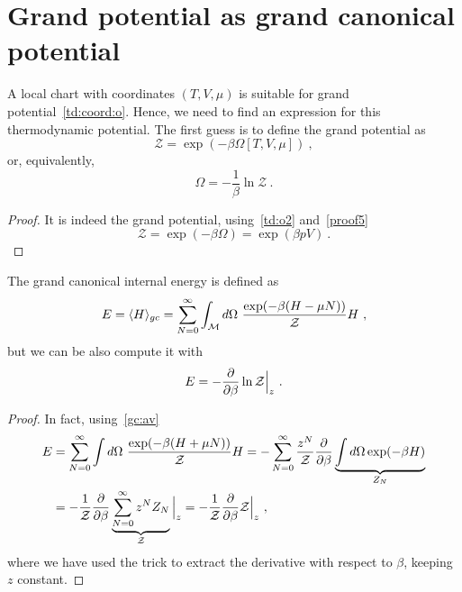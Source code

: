 \section{Grand potential as grand canonical potential} 

    A local chart with coordinates $(T, V, \mu)$ is suitable for grand potential~\eqref{td:coord:o}. Hence, we need to find an expression for this thermodynamic potential. The first guess is to define the grand potential as 
    \begin{equation}\label{gc:zo}
        \mathcal Z = \exp(- \beta \Omega[T, V, \mu]) ~,
    \end{equation}
    or, equivalently,
    \begin{equation}\label{gc:o}
        \Omega = - \frac{1}{\beta} \ln \mathcal Z ~.
    \end{equation}
    \begin{proof}
        It is indeed the grand potential, using~\eqref{td:o2} and~\eqref{proof5}
        \begin{equation*}
            \mathcal Z = \exp(- \beta \Omega) = \exp(\beta p V) ~.
        \end{equation*}
    \end{proof}

    The grand canonical internal energy is defined as
    \begin{equation}\label{gc:e}
        E = \langle H\rangle_{gc} = \sum_{N = 0}^{\infty} \int_{\mathcal M} d\Omega ~ \frac{\exp (-\beta (H - \mu N ))}{\mathcal Z} H ~,
    \end{equation}
    but we can be also compute it with
    \begin{equation}\label{gc:e2}
        E = - \frac{\partial}{\partial\beta} \ln \mathcal Z \Big \vert_z ~.
    \end{equation}
    \begin{proof}
        In fact, using~\eqref{gc:av}
        \begin{equation*}
        \begin{aligned}
            E & = \sum_{N=0}^{\infty} \int d\Omega ~ \frac{\exp(-\beta (H + \mu N))}{\mathcal Z} H = - \sum_{N=0}^{\infty} \frac{z^N}{\mathcal Z} \frac{\partial}{\partial\beta} \underbrace{\int d\Omega \exp (-\beta H)}_{Z_N} \\ &  = - \frac{1}{\mathcal Z} \frac{\partial}{\partial\beta} \underbrace{\sum_{N=0}^{\infty} z^N Z_N}_{\mathcal Z} \Big \vert_z = - \frac{1}{\mathcal Z} \frac{\partial}{\partial\beta} \mathcal Z \Big \vert_z ~,
        \end{aligned}
        \end{equation*}
        where we have used the trick to extract the derivative with respect to $\beta$, keeping $z$ constant.
    \end{proof}

